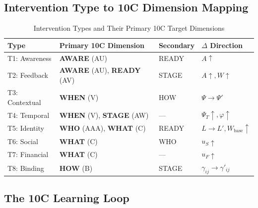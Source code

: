 \subsection{Intervention Type to 10C Dimension Mapping}

\begin{table}[htbp]
\centering
\caption{Intervention Types and Their Primary 10C Target Dimensions}
\label{tab:hhh-type-to-9c}
\renewcommand{\arraystretch}{1.3}
\small
\begin{tabular}{@{}llll@{}}
\toprule
\textbf{Type} & \textbf{Primary 10C Dimension} & \textbf{Secondary} & \textbf{$\Delta$ Direction} \\
\midrule
T1: Awareness & \textbf{AWARE} (AU) & READY & $A \uparrow$ \\
T2: Feedback & \textbf{AWARE} (AU), \textbf{READY} (AV) & STAGE & $A \uparrow, W \uparrow$ \\
T3: Contextual & \textbf{WHEN} (V) & HOW & $\Psi \rightarrow \Psi'$ \\
T4: Temporal & \textbf{WHEN} (V), \textbf{STAGE} (AW) & --- & $\Psi_T \uparrow, \varphi \uparrow$ \\
T5: Identity & \textbf{WHO} (AAA), \textbf{WHAT} (C) & READY & $L \rightarrow L', W_{\text{base}} \uparrow$ \\
T6: Social & \textbf{WHAT} (C) & WHO & $u_S \uparrow$ \\
T7: Financial & \textbf{WHAT} (C) & --- & $u_F \uparrow$ \\
T8: Binding & \textbf{HOW} (B) & STAGE & $\gamma_{ij} \rightarrow \gamma'_{ij}$ \\
\bottomrule
\end{tabular}
\end{table}

\subsection{The 10C Learning Loop}

